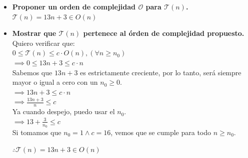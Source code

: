 \documentclass[12 pt]{article}
\begin{document}
\begin{itemize}
        \item \textbf{Proponer un orden de complejidad $\mathcal{O}$ para $\mathcal{T}(n)$.} \\
        \(\mathcal{T}(n) = 13n+3 \in O(n)\)
        \item \textbf{Mostrar que $\mathcal{T}(n)$ pertenece al órden de complejidad propuesto.} \\
        Quiero verificar que: \\
        \(0 \leq \mathcal{T}(n) \leq c \cdot O(n), (\forall n \geq n_{0})\) \\
        \(\implies 0 \leq 13n+3 \leq c \cdot n\) \\
        Sabemos que $13n+3$ es estrictamente creciente, por lo tanto, será siempre mayor o igual a cero con un $n_{0} \geq 0$. \\
        \(\implies 13n+3 \leq c \cdot n\) \\
        \(\implies \frac{13n+3}{n} \leq c\) \\
        Ya cuando despejo, puedo usar el $n_{0}$. \\
        \(\implies 13+\frac{3}{n_{0}} \leq c\) \\
        Si tomamos que \(n_{0} = 1 \wedge c = 16\), vemos que se cumple para todo $n \geq n_{0}$.
        \begin{center}
            \(\therefore \mathcal{T}(n) = 13n+3 \in O(n)\)
        \end{center}
    \end{itemize}
\end{document}
